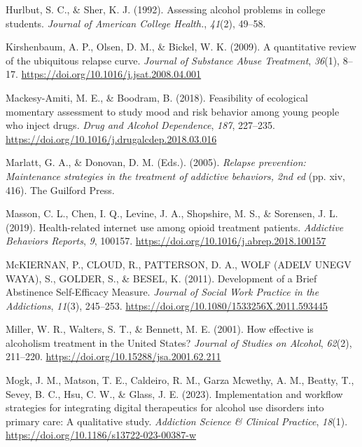 \documentclass[
  letterpaper,
  DIV=11,
  numbers=noendperiod]{scrartcl}
\newlength{\cslhangindent}
\newenvironment{CSLReferences}[2] %
 {\begin{list}{}{%
  \setlength{\itemindent}{0pt}
  \setlength{\leftmargin}{0pt}
  \setlength{\parsep}{0pt}
  \ifodd #1
   \setlength{\leftmargin}{\cslhangindent}
   \setlength{\itemindent}{-1\cslhangindent}
  \fi
  \setlength{\itemsep}{#2\baselineskip}}}
 {\end{list}}
\begin{document}
\begin{CSLReferences}{1}{0}
Hurlbut, S. C., \& Sher, K. J. (1992). Assessing alcohol problems in
college students. \emph{Journal of American College Health.},
\emph{41}(2), 49--58.

Kirshenbaum, A. P., Olsen, D. M., \& Bickel, W. K. (2009). A
quantitative review of the ubiquitous relapse curve. \emph{Journal of
Substance Abuse Treatment}, \emph{36}(1), 8--17.
\url{https://doi.org/10.1016/j.jsat.2008.04.001}

Mackesy-Amiti, M. E., \& Boodram, B. (2018). Feasibility of ecological
momentary assessment to study mood and risk behavior among young people
who inject drugs. \emph{Drug and Alcohol Dependence}, \emph{187},
227--235. \url{https://doi.org/10.1016/j.drugalcdep.2018.03.016}

Marlatt, G. A., \& Donovan, D. M. (Eds.). (2005). \emph{Relapse
prevention: {Maintenance} strategies in the treatment of addictive
behaviors, 2nd ed} (pp. xiv, 416). The Guilford Press.

Masson, C. L., Chen, I. Q., Levine, J. A., Shopshire, M. S., \&
Sorensen, J. L. (2019). Health-related internet use among opioid
treatment patients. \emph{Addictive Behaviors Reports}, \emph{9},
100157. \url{https://doi.org/10.1016/j.abrep.2018.100157}

McKIERNAN, P., CLOUD, R., PATTERSON, D. A., WOLF (ADELV UNEGV WAYA), S.,
GOLDER, S., \& BESEL, K. (2011). Development of a {Brief Abstinence
Self-Efficacy Measure}. \emph{Journal of Social Work Practice in the
Addictions}, \emph{11}(3), 245--253.
\url{https://doi.org/10.1080/1533256X.2011.593445}

Miller, W. R., Walters, S. T., \& Bennett, M. E. (2001). How effective
is alcoholism treatment in the {United States}? \emph{Journal of Studies
on Alcohol}, \emph{62}(2), 211--220.
\url{https://doi.org/10.15288/jsa.2001.62.211}

Mogk, J. M., Matson, T. E., Caldeiro, R. M., Garza Mcwethy, A. M.,
Beatty, T., Sevey, B. C., Hsu, C. W., \& Glass, J. E. (2023).
Implementation and workflow strategies for integrating digital
therapeutics for alcohol use disorders into primary care: {A}
qualitative study. \emph{Addiction Science \& Clinical Practice},
\emph{18}(1). \url{https://doi.org/10.1186/s13722-023-00387-w}


\end{CSLReferences}
\end{document}
